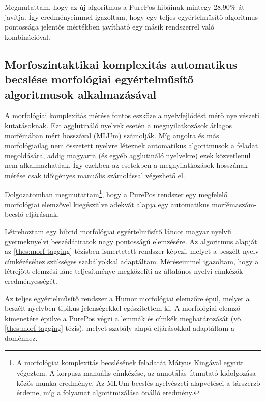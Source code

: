 Megmutattam, hogy az új algoritmus a PurePos hibáinak mintegy 28,90\%-át javítja. 
Így eredményeimmel igazoltam, hogy egy teljes egyértelműsítő algoritmus pontossága jelentős mértékben javítható egy másik rendszerrel való kombinációval. 

\subsection{Morfoszintaktikai komplexitás automatikus becslése morfológiai egyértelműsítő algoritmusok alkalmazásával}
\label{thes:mlu}

A morfológiai komplexitás mérése fontos eszköze a nyelvfejlődést mérő nyelvészeti kutatásoknak.
Ezt agglutináló nyelvek esetén a megnyilatkozások átlagos morfémában mért hosszával (MLUm) számolják.
Míg angolra és más morfológiailag nem összetett nyelvre léteznek automatikus algoritmusok a feladat megoldására, addig magyarra (és egyéb agglutináló nyelvekre) ezek közvetlenül nem alkalmazhatóak. 
Így ezekben az esetekben a megnyilatkozások hosszának mérése csak időigényes manuális számolással végezhető el.

Dolgozatomban megmutattam\footnote{A morfológiai komplexitás becslésének feladatát Mátyus Kingával együtt végeztem. A korpusz manuális címkézése, az annotálás útmutató kidolgozása közös munka eredménye. Az MLUm becslés nyelvészeti alapvetései a társzerző érdeme, míg a folyamat algoritmizálása önálló eredmény.}, hogy a PurePos rendszer egy megfelelő morfológiai elemzővel kiegészülve adekvát alapja egy automatikus morfémaszám-becslő eljárásnak. %

\begin{core}
\begin{thesis}
\label{thes:spoken-morf-tagging}
Létrehoztam egy  hibrid morfológiai egyértelműsítő láncot magyar nyelvű gyermeknyelvi beszédátiratok nagy pontosságú elemzésére. 
Az algoritmus alapját az \ref{thes:morf-tagging} tézisben ismertetett rendszer képezi, melyet a beszélt nyelv címkézéséhez szükséges szabályokkal adaptáltam. 
Méréseimmel igazoltam, hogy a létrejött elemzési lánc teljesítménye megközelíti az általános nyelvi címkézők eredményességét.
\end{thesis}

\begin{pub}
\cite{Matyus2014,Orosz2014c}
\end{pub}
\end{core}

Az teljes egyértelműsítő rendszer a Humor morfológiai elemzőre épül, melyet a beszélt nyelvben tipikus jelenségekkel egészítettem ki. 
A morfológiai elemző kimenetére épülve a PurePos végzi a lemmák és címkék meghatározását (vö. \ref{thes:morf-tagging} tézis), melyet szabály alapú eljárásokkal adaptáltam a doménhez.

